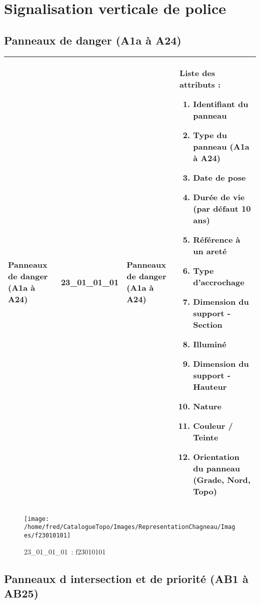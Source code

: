 \documentclass[12pt,titlepage]{book}
\begin{document}
\section{\large Signalisation verticale de police}
\subsection{Panneaux de danger (A1a à A24)}
\noindent
\vspace{\baselineskip}

\renewcommand{\arraystretch}{1.2}
\begin{supertabular}{|p{10cm}|c|p{13cm}|p{12cm}|}
 Panneaux de danger (A1a à A24) & 23\_01\_01\_01 & Panneaux de danger (A1a à A24) & Liste des attributs :
\begin{enumerate}
  \item Identifiant du panneau  \item Type du panneau (A1a à A24)  \item Date de pose  \item Durée de vie (par défaut 10 ans)  \item Référence à un areté  \item Type d'accrochage  \item Dimension du support - Section  \item Illuminé  \item Dimension du support - Hauteur  \item Nature  \item Couleur / Teinte  \item Orientation du panneau (Grade, Nord, Topo)\end{enumerate}
\\
\hline
\end{supertabular}
\begin{figure}[h!]
  \hfill         %
  \begin{minipage}[t]{3cm}
    \begin{center}
      \texttt{[image: /home/fred/CatalogueTopo/Images/RepresentationChagneau/Images/f23010101]}
      \caption[~23\_01\_01\_01]{\small{23\_01\_01\_01~:} \tiny{f23010101}}\label{f23010101}
    \end{center}
  \end{minipage}
\end{figure}


\subsection{Panneaux d intersection et de priorité (AB1 à AB25)}
\noindent
\vspace{\baselineskip}
\end{document}
